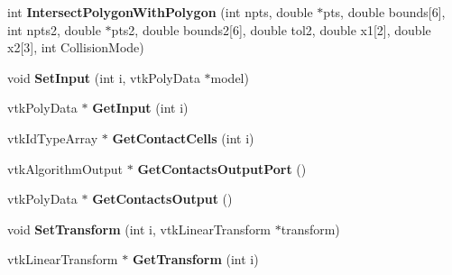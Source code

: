 \begin{DoxyCompactItemize}
\item 
\hypertarget{classvtkCollisionDetectionFilter_af14425c5380341bcae1fdd7abb83d577}{
int {\bfseries IntersectPolygonWithPolygon} (int npts, double $\ast$pts, double bounds\mbox{[}6\mbox{]}, int npts2, double $\ast$pts2, double bounds2\mbox{[}6\mbox{]}, double tol2, double x1\mbox{[}2\mbox{]}, double x2\mbox{[}3\mbox{]}, int CollisionMode)}
\label{classvtkCollisionDetectionFilter_af14425c5380341bcae1fdd7abb83d577}

\item 
\hypertarget{classvtkCollisionDetectionFilter_ac5a18634e9ad5382375ed0da218f41d4}{
void {\bfseries SetInput} (int i, vtkPolyData $\ast$model)}
\label{classvtkCollisionDetectionFilter_ac5a18634e9ad5382375ed0da218f41d4}

\item 
\hypertarget{classvtkCollisionDetectionFilter_a9733060c3cd48007717a592848f4598d}{
vtkPolyData $\ast$ {\bfseries GetInput} (int i)}
\label{classvtkCollisionDetectionFilter_a9733060c3cd48007717a592848f4598d}

\item 
\hypertarget{classvtkCollisionDetectionFilter_a30e5fd1cab7365f82cd8b3176d635174}{
vtkIdTypeArray $\ast$ {\bfseries GetContactCells} (int i)}
\label{classvtkCollisionDetectionFilter_a30e5fd1cab7365f82cd8b3176d635174}

\item 
\hypertarget{classvtkCollisionDetectionFilter_af35d6473c8183dbc8bc88d19b62d745f}{
vtkAlgorithmOutput $\ast$ {\bfseries GetContactsOutputPort} ()}
\label{classvtkCollisionDetectionFilter_af35d6473c8183dbc8bc88d19b62d745f}

\item 
\hypertarget{classvtkCollisionDetectionFilter_af5ed45a00c16a45bae13d2e2753c9d21}{
vtkPolyData $\ast$ {\bfseries GetContactsOutput} ()}
\label{classvtkCollisionDetectionFilter_af5ed45a00c16a45bae13d2e2753c9d21}

\item 
\hypertarget{classvtkCollisionDetectionFilter_a2ddf69aa3b9cbb85c00b5e81a035437c}{
void {\bfseries SetTransform} (int i, vtkLinearTransform $\ast$transform)}
\label{classvtkCollisionDetectionFilter_a2ddf69aa3b9cbb85c00b5e81a035437c}

\item 
\hypertarget{classvtkCollisionDetectionFilter_a86319e78819c3c9a1bb027a8a0de2fd0}{
vtkLinearTransform $\ast$ {\bfseries GetTransform} (int i)}
\label{classvtkCollisionDetectionFilter_a86319e78819c3c9a1bb027a8a0de2fd0}


\end{DoxyCompactItemize}
